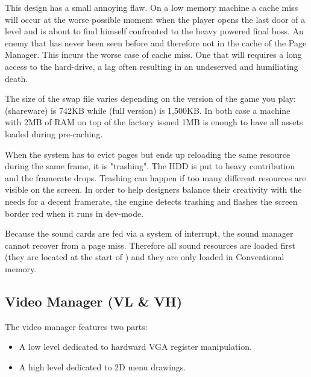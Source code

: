 \documentclass[book.tex]{subfiles}
\begin{document}
\par
This design has a small annoying flaw. On a low memory machine a cache miss will occur at the worse possible moment when the player opens the last door of a level and is about to find himself confronted to the heavy powered final boss. An enemy that has never been seen before and therefore not in the cache of the Page Manager. This incurs the worse case of cache miss. One that will requires a long access to the hard-drive, a lag often resulting in an undeserved and humiliating death.\\
\par
The size of the swap file varies depending on the version of the game you play:  (shareware) is 742KB while  (full version) is 1,500KB. In both case a machine with 2MB of RAM on top of the factory issued 1MB is enough to have all assets loaded during pre-caching.\\
\par
{} When the system has to evict pages but ends up reloading the same resource during the same frame, it is "trashing". The HDD is put to heavy contribution and the framerate drops. Trashing can happen if too many different resources are visible on the screen. In order to help designers balance their creativity with the needs for a decent framerate, the engine detects trashing and flashes the screen border red when it runs in dev-mode.\\
\par
{} Because the sound cards are fed via a system of interrupt, the sound manager cannot recover from a page miss. Therefore all sound resources are loaded first (they are located at the start of ) and they are only loaded in Conventional memory.











\subsection{Video Manager (VL \& VH)}
The video manager features two parts:
\begin{itemize}
\item A low level dedicated to hardward VGA register manipulation.
\item A high level dedicated to 2D menu drawings.
\end{itemize}
\par
\end{document}
